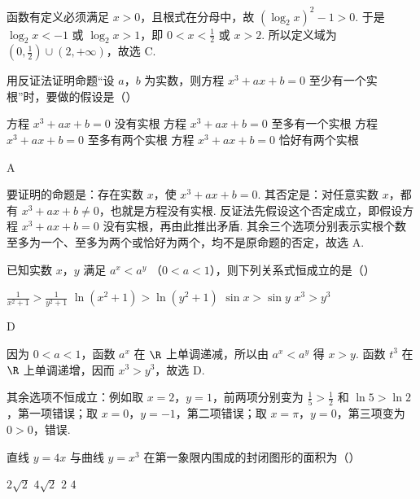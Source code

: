 \begin{solution}
函数有定义必须满足 \(x>0\)，且根式在分母中，故
\((\log_2x)^2-1>0\). 于是 \(\log_2x<-1\) 或 \(\log_2x>1\)，即
\(0<x<\frac12\) 或 \(x>2\). 所以定义域为
\(\left(0,\frac12\right)\cup(2,+\infty)\)，故选 C.
\end{solution}

\begin{problem}
用反证法证明命题“设 \(a\)，\(b\) 为实数，则方程 \(x^{3} + ax + b = 0\) 至少有一个实根”时，要做的假设是（\quad）

\choices
    {方程 \( x^{3} + ax + b = 0 \) 没有实根}
    {方程 \( x^{3} + ax + b = 0 \) 至多有一个实根}
    {方程 \( x^{3} + ax + b = 0 \) 至多有两个实根}
    {方程 \( x^{3} + ax + b = 0 \) 恰好有两个实根}
\end{problem}

\begin{answer}
A
\end{answer}

\begin{solution}
要证明的命题是：存在实数 \(x\)，使 \(x^3+ax+b=0\). 其否定是：对任意实数 \(x\)，都有 \(x^3+ax+b\ne0\)，也就是方程没有实根. 反证法先假设这个否定成立，即假设方程
\(x^3+ax+b=0\) 没有实根，再由此推出矛盾. 其余三个选项分别表示实根个数至多为一个、至多为两个或恰好为两个，均不是原命题的否定，故选 A.
\end{solution}

\begin{problem}
已知实数 \(x\)，\(y\) 满足 \(a^x < a^y\) （\(0 < a < 1\)），则下列关系式恒成立的是（\quad）

\choices
    {\(\frac{1}{x^2 + 1} > \frac{1}{y^2 + 1}\)}
    {\(\ln (x^2 + 1) > \ln (y^2 + 1)\)}
    {\(\sin x > \sin y\)}
    {\(x^{3} > y^{3}\)}
\end{problem}

\begin{answer}
D
\end{answer}

\begin{solution}
因为 \(0<a<1\)，函数 \(a^x\) 在 \(\R\) 上单调递减，所以由 \(a^x<a^y\) 得 \(x>y\). 函数 \(t^3\) 在 \(\R\) 上单调递增，因而 \(x^3>y^3\)，故选 D.

其余选项不恒成立：例如取 \(x=2\)，\(y=1\)，前两项分别变为 \(\frac15>\frac12\) 和 \(\ln5>\ln2\)，第一项错误；取 \(x=0\)，\(y=-1\)，第二项错误；取 \(x=\pi\)，\(y=0\)，第三项变为 \(0>0\)，错误.
\end{solution}

\begin{problem}
直线 \( y = 4x \) 与曲线 \( y = x^3 \) 在第一象限内围成的封闭图形的面积为（\quad）

\choices
    {\(2\sqrt{2}\)}
    {\(4\sqrt{2}\)}
    {\(2\)}
    {\(4\)}
\end{problem}

